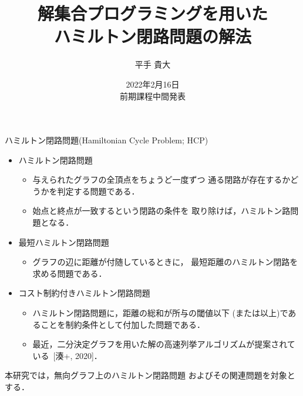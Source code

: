 \documentclass[dvipdfmx]{beamer}
\title{解集合プログラミングを用いた\\ハミルトン閉路問題の解法}
\author{平手 貴大}
\date{2022年2月16日\\前期課程中間発表}
\institute{番原研究室}
\begin{document}
\frame{\maketitle}
\begin{frame}{ハミルトン閉路問題(Hamiltonian Cycle Problem; HCP)}
  \begin{itemize}
  \item \alert{ハミルトン閉路問題}
    \begin{itemize}
    \item 与えられたグラフの全頂点をちょうど一度ずつ
      通る閉路が存在するかどうかを判定する問題である．
    \item 始点と終点が一致するという閉路の条件を
      取り除けば，ハミルトン路問題となる．
    \end{itemize}
  \item \alert{最短ハミルトン閉路問題}
    \begin{itemize}
    \item グラフの辺に距離が付随しているときに，
      最短距離のハミルトン閉路を求める問題である．
    \end{itemize}
  \item \alert{コスト制約付きハミルトン閉路問題}
    \begin{itemize}
    \item ハミルトン閉路問題に，距離の総和が所与の閾値以下
      (または以上)であることを制約条件として付加した問題である．
    \item 最近，二分決定グラフを用いた解の高速列挙アルゴリズムが提案されている~[湊+, 2020]．
    \end{itemize}
  \end{itemize}
  \begin{alertblock}{}
    本研究では，無向グラフ上のハミルトン閉路問題
    およびその関連問題を対象とする．    
  \end{alertblock}
\end{frame}
\end{document}
